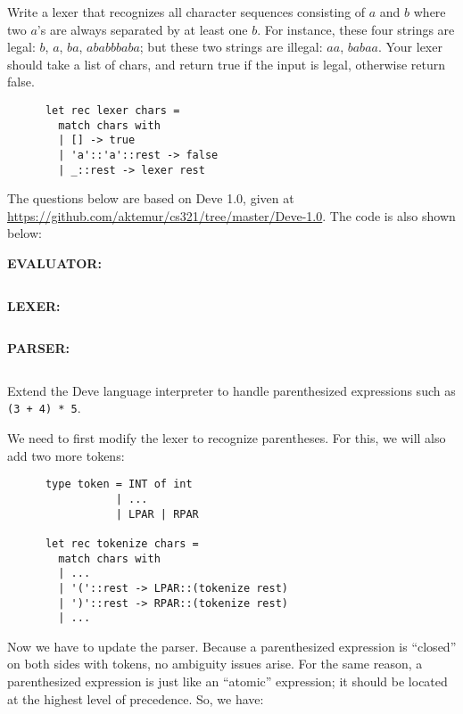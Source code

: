 \documentclass[addpoints]{exam}
\begin{document}
\begin{questions}
  
  \question
  Write a lexer that recognizes all character sequences
  consisting of 
  $a$ and $b$ where two $a$'s are always separated by at least one $b$.
  For instance, these four strings are legal: $b$, $a$, $ba$, $ababbbaba$;
  but these two strings are illegal: $aa$, $babaa$.
  Your lexer should take a list of chars, and return
  true if the input is legal, otherwise return false.

  \begin{solutionbox}{3.5cm}
    \begin{verbatim}
      let rec lexer chars =
        match chars with
        | [] -> true
        | 'a'::'a'::rest -> false
        | _::rest -> lexer rest      
    \end{verbatim}    
  \end{solutionbox}


  \newpage
  \begin{framed}
    {\color{red}
    The questions below are based on Deve 1.0, given at
    \url{https://github.com/aktemur/cs321/tree/master/Deve-1.0}.
    The code is also shown below:}
  \end{framed}

  \textbf{EVALUATOR:}\\
  \inputminted{ocaml}{../../Deve-1.0/deve.ml}

  \textbf{LEXER:}\\
  \inputminted{ocaml}{../../Deve-1.0/lexer.ml}

  \textbf{PARSER:}\\
  \inputminted{ocaml}{../../Deve-1.0/parser.ml}

  
  
  \question
  Extend the Deve language interpreter to handle parenthesized expressions
  such as \texttt{(3 + 4) * 5}.

  \begin{solution}
    We need to first modify the lexer to recognize parentheses.
    For this, we will also add two more tokens:
    
    \begin{verbatim}
      type token = INT of int
                 | ...
                 | LPAR | RPAR

      let rec tokenize chars =
        match chars with
        | ...
        | '('::rest -> LPAR::(tokenize rest)
        | ')'::rest -> RPAR::(tokenize rest)
        | ...
    \end{verbatim}

    Now we have to update the parser.
    Because a parenthesized expression is
    ``closed'' on both sides with tokens,
    no ambiguity issues arise. For the same reason,
    a parenthesized expression is just like an ``atomic''
    expression; it should be located at the highest level of precedence.
    So, we have:


\end{solution}
\end{questions}
\end{document}
